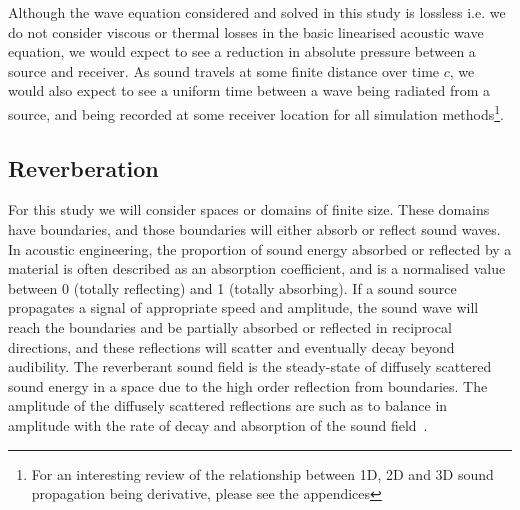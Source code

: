 Although the wave equation considered and solved in this study is lossless i.e. we do not consider viscous or thermal losses in the basic linearised acoustic wave equation, we would expect to see a reduction in absolute pressure between a source and receiver. As sound travels at some finite distance over time $c$, we would also expect to see a uniform time between a wave being radiated from a source, and being recorded at some receiver location for all simulation methods\footnote{For an interesting review of the relationship between 1D, 2D and 3D sound propagation being derivative, please see the appendices}.\\ 

\subsection{Reverberation}
For this study we will consider spaces or domains of finite size. These domains have boundaries, and those boundaries will either absorb or reflect sound waves. In acoustic engineering, the proportion of sound energy absorbed or reflected by a material is often described as an absorption coefficient, and is a normalised value between 0 (totally reflecting) and 1 (totally absorbing). If a sound source propagates a signal of appropriate speed and amplitude, the sound wave will reach the boundaries and be partially absorbed or reflected in reciprocal directions, and these reflections will scatter and eventually decay beyond audibility. The reverberant sound field is the steady-state of diffusely scattered sound energy in a space due to the high order reflection from boundaries. The amplitude of the diffusely scattered reflections are such as to balance in amplitude with the rate of decay and absorption of the sound field~\cite{Everest2009}.\\ 


